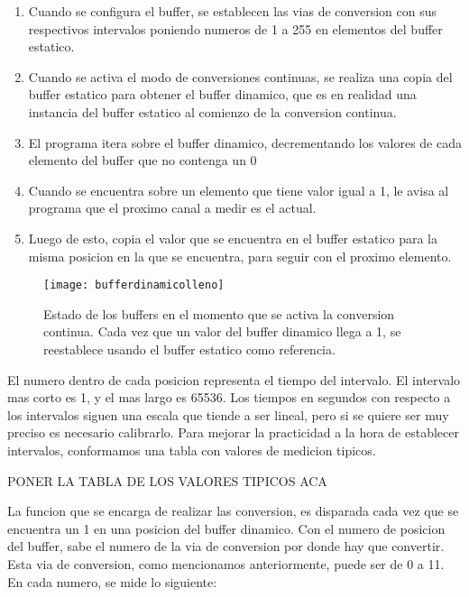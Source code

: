\begin{enumerate}
\item Cuando se configura el buffer, se establecen las vias de conversion con sus respectivos intervalos poniendo numeros de 1 a 255 en elementos del buffer estatico.
\item Cuando se activa el modo de conversiones continuas, se realiza una copia del buffer estatico para obtener el buffer dinamico, que es en realidad una instancia del buffer estatico al comienzo de la conversion continua.
\item El programa itera sobre el buffer dinamico, decrementando los valores de cada elemento del buffer que no contenga un 0
\item Cuando se encuentra sobre un elemento que tiene valor igual a 1, le avisa al programa que el proximo canal a medir es el actual.
\item Luego de esto, copia el valor que se encuentra en el buffer estatico para la misma posicion en la que se encuentra, para seguir con el proximo elemento.
\end{enumerate}

\begin{figure}[h]
  \centering
  \texttt{[image: bufferdinamicolleno]}
  \caption{Estado de los buffers en el momento que se activa la conversion continua. Cada vez que un valor del buffer dinamico llega a 1, se reestablece usando el buffer estatico como referencia.}\label{fig:bufferdinamicolleno}
\end{figure}

El numero dentro de cada posicion representa el tiempo del intervalo. El intervalo mas corto es 1, y el mas largo es 65536. Los tiempos en segundos con respecto a los intervalos siguen una escala que tiende a ser lineal, pero si se quiere ser muy preciso es necesario calibrarlo. Para mejorar la practicidad a la hora de establecer intervalos, conformamos una tabla con valores de medicion tipicos.

PONER LA TABLA DE LOS VALORES TIPICOS ACA

La funcion que se encarga de realizar las conversion, es disparada cada vez que se encuentra un 1 en una posicion del buffer dinamico. Con el numero de posicion del buffer, sabe el numero de la via de conversion por donde hay que convertir. Esta via de conversion, como mencionamos anteriormente, puede ser de 0 a 11. En cada numero, se mide lo siguiente:

